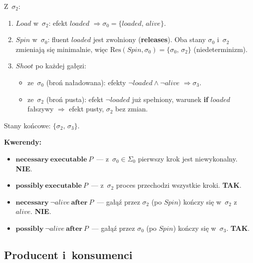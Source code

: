 \documentclass[11pt,a4paper]{article}
\newcommand{\aft}{\textbf{after}}
\renewcommand{\iff}{\textbf{if}}
\newcommand{\releases}{\textbf{releases}}
\newcommand{\necessary}{\textbf{necessary}}
\newcommand{\possibly}{\textbf{possibly}}
\newcommand{\executable}{\textbf{executable}}
\begin{document}
\newpage\noindent
Z~$\sigma_2$:
\begin{enumerate}
  \item $\mathit{Load}$ w~$\sigma_2$: efekt $\mathit{loaded}$
        $\Rightarrow \sigma_0 = \{\mathit{loaded},\,\mathit{alive}\}$.
  \item $\mathit{Spin}$ w~$\sigma_0$: fluent $\mathit{loaded}$ jest zwolniony
        (\releases{}).
        Oba stany $\sigma_0$ i~$\sigma_2$ zmieniają się minimalnie,
        więc $\mathrm{Res}(\mathit{Spin}, \sigma_0) = \{\sigma_0,\, \sigma_2\}$
        (niedeterminizm).
  \item $\mathit{Shoot}$ po każdej gałęzi:
    \begin{itemize}
      \item ze~$\sigma_0$ (broń naładowana):
            efekty $\neg\mathit{loaded} \land \neg\mathit{alive}$
            $\Rightarrow \sigma_3$.
      \item ze~$\sigma_2$ (broń pusta):
            efekt $\neg\mathit{loaded}$ już spełniony,
            warunek \iff{} $\mathit{loaded}$ fałszywy
            $\Rightarrow$ efekt pusty, $\sigma_2$ bez zmian.
    \end{itemize}
\end{enumerate}

Stany końcowe: $\{\sigma_2,\, \sigma_3\}$.

\medskip
\noindent\textbf{Kwerendy:}
\begin{itemize}
  \item $\necessary\ \executable\ P$~---
    z~$\sigma_0 \in \Sigma_0$ pierwszy krok jest niewykonalny.
    \textbf{NIE}.

  \item $\possibly\ \executable\ P$~---
    z~$\sigma_2$ proces przechodzi wszystkie kroki.
    \textbf{TAK}.

  \item $\necessary\ \neg\mathit{alive}\ \aft\ P$~---
    gałąź przez $\sigma_2$ (po $\mathit{Spin}$) kończy się w~$\sigma_2$
    z~$\mathit{alive}$.
    \textbf{NIE}.

  \item $\possibly\ \neg\mathit{alive}\ \aft\ P$~---
    gałąź przez $\sigma_0$ (po $\mathit{Spin}$) kończy się w~$\sigma_3$.
    \textbf{TAK}.
\end{itemize}

\subsection{Producent i~konsumenci}
\end{document}
